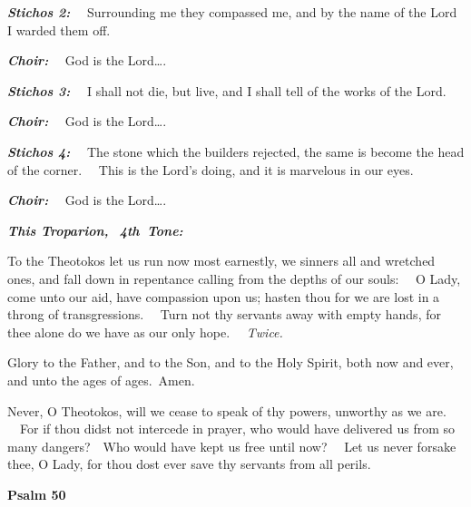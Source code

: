 \textbf{\emph{Stichos 2:}}
~~Surrounding me they compassed me, and by the name of the Lord I warded them off.

\textbf{\emph{Choir:}}
~~God is the Lord\ldots.

\textbf{\emph{Stichos 3:}}
~~I shall not die, but live, and I shall tell of the works of the Lord.

\textbf{\emph{Choir:}}
~~God is the Lord\ldots.

\textbf{\emph{Stichos 4:}}
~~The stone which the builders rejected, the same is become the head of the corner.
~~This is the Lord's doing, and it is marvelous in our eyes.

\textbf{\emph{Choir:}}
~~God is the Lord\ldots.

\emph{\textbf{This Troparion,}
~\textbf{4th~Tone:}}

To the Theotokos let us run now most earnestly, we sinners all and wretched ones, and fall down in repentance calling from the depths of our souls:
~~O Lady, come unto our aid, have compassion upon us; 
hasten thou for we are lost in a throng of transgressions.
~~Turn not thy servants away with empty hands, for thee alone do we have as our only hope.
~~\emph{Twice.}

Glory to the Father, and to the Son, and to the Holy Spirit, both now and ever, and unto the ages of ages.~Amen.

Never, O Theotokos, will we cease to speak of thy powers, unworthy as we are.
~~For if thou didst not intercede in prayer, who would have delivered us from so many dangers?~~Who would have kept us free until now?
~~Let us never forsake thee, O Lady, for thou dost ever save thy servants from all perils.

\textbf{Psalm 50}

